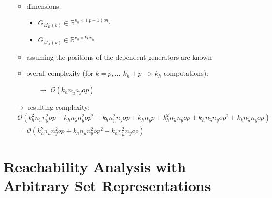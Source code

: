 \documentclass{article}
\begin{document}
\begin{itemize}
    \begin{itemize}
        \item dimensions:
        \begin{itemize}
            \item $G_{M_{B}(k)} \in \mathbb{R}^{n_{y} \times (p+1) o n_{\tilde{u}}}$            
            \item $G_{M_{A}(k)} \in \mathbb{R}^{n_{y} \times ko n_{\tilde{u}}}$    
        \end{itemize}
        \item assuming the positions of the dependent generators are known
        \item overall complexity (for $k=p,...,k_h+p$ --> $k_h$ computations):
        \begin{itemize}
            \item[$\rightarrow$] $\mathcal{O}(k_h n_{\tilde{u}} n_{y} o p)$
        \end{itemize}
    \end{itemize}
    \item[$\rightarrow$] resulting complexity: \begin{align*}
        \mathcal{O}(
      k_h^2 n_{\tilde{u}} n_y^2 o p + k_h n_{\tilde{u}} n_y^2 o p^2
    + k_h n_{\tilde{u}}^2 n_y o p 
    + k_h n_y p
    + k_h^2 n_{\tilde{u}} n_{y} o p + k_h n_{\tilde{u}} n_{y} o p^2 
    + k_h n_{\tilde{u}} n_{y} o p) \\
    = 
    \mathcal{O}(k_h^2 n_{\tilde{u}} n_y^2 o p + k_h n_{\tilde{u}} n_y^2 o p^2
    + k_h n_{\tilde{u}}^2 n_y o p)
    \end{align*}
\end{itemize}

\newpage
\section{Reachability Analysis with Arbitrary Set Representations} \label{sec:meth2}
\end{document}
